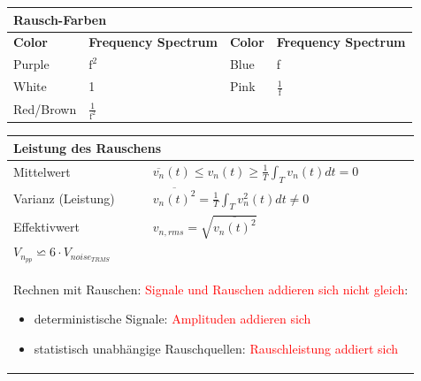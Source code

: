 \vspace{-2.5\topsep}
\begin{longtable}{|p{4.27cm}p{4.27cm}|p{4.27cm}p{4.27cm}|}
    \hline
    \multicolumn{4}{|l|}{\bf Rausch-Farben}
    \\ \hline
    \textbf{Color} & \textbf{Frequency Spectrum} & \textbf{Color} & \textbf{Frequency Spectrum}
    \\ \hline
    Purple         & $\mathrm{f^2}$              & Blue           & f\\
    White          & 1                           & Pink           & $\mathrm{\frac{1}{f}}$\\
    Red/Brown      & $\mathrm{\frac{1}{f^2}}$    &                & \\
    \hline
\end{longtable}
\vspace{-2.5\topsep}
\renewcommand{\arraystretch}{1.8}
\begin{longtable}{|p{5cm}|p{12.9cm}|}
    \hline
    \multicolumn{2}{|l|}{\bf Leistung des Rauschens}
    \\ \hline
    Mittelwert	
    & $\overline{v_{n}}(t)\leq v_{n}(t)\geq \frac{1}{T}\int_{T}v_{n}(t)dt=0$ 
    \\ \hline
    Varianz (Leistung)
    & $\overline{v_{n}(t)^2}=\frac{1}{T}\int_{T}v^2_{n}(t)dt\neq0$
    \\ \hline
    Effektivwert
    & $v_{n,rms}=\sqrt{\overline{v_{n}(t)^2}}$
    \\ \hline
    \multicolumn{2}{|l|}{$V_{n_{pp}} \backsimeq 6 \cdot V_{noise_{TRMS}}$}
    \\ \hline
    \multicolumn{2}{|l|}{\parbox{17.9cm}{\vspace{2mm}
        Rechnen mit Rauschen: \textcolor{red}{Signale und Rauschen addieren sich nicht gleich}:
        \begin{itemize}
            \item deterministische Signale: \textcolor{red}{Amplituden addieren sich}
            \item statistisch unabhängige Rauschquellen: \textcolor{red}{Rauschleistung addiert sich}
        \end{itemize}\vspace{2mm}}}
    \\ \hline
\end{longtable}
